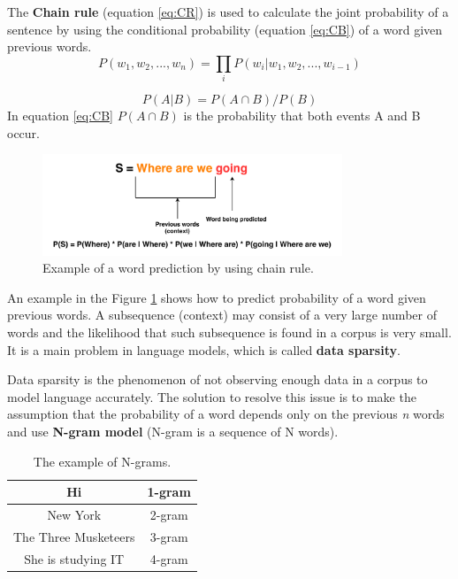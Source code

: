 The \textbf{Chain rule} (equation \ref{eq:CR}) is used to calculate the joint probability of a sentence by using the conditional probability (equation \ref{eq:CB}) of a word given previous words. 
\begin{equation} \label{eq:CR}
P(w_1, w_2,..., w_n) = \prod_{i}P(w_i|w_1, w_2,...,w_{i-1})
\end{equation}

\begin{equation} \label{eq:CB}
P(A|B) = P(A \cap B) / P(B)
\end{equation}
In equation \ref{eq:CB} $P(A \cap B)$ is the probability that both events A and B occur.

\begin{figure}[hbt]
  \centering
  \includegraphics[width=0.8\textwidth]{figures/lm.pdf}
  \caption{Example of a word prediction by using chain rule.}
  \label{chain_rule}
\end{figure}

An example in the Figure \ref{chain_rule} shows how to predict probability of a word given previous words. A subsequence (context) may consist of a very large number of words and the likelihood that such subsequence is found in a corpus is very small. It is a main problem in language models, which is called \textbf{data sparsity}.

Data sparsity is the phenomenon of not observing enough data in a corpus to model language accurately. The solution to resolve this issue is to make the assumption that the probability of a word depends only on the previous \textit{n} words and use \textbf{N-gram model} (N-gram is a sequence of N words).

\begin{table}[t]
  \centering
   \begin{tabular}{|c|c|} 
   \hline
    Hi & 1-gram \\
   \hline
    New York & 2-gram \\
   \hline
   The Three Musketeers & 3-gram \\
   \hline
   She is studying IT & 4-gram \\
   \hline
   \end{tabular}
   \caption{The example of N-grams.}
  \label{tab:n_gram}
\end{table}

